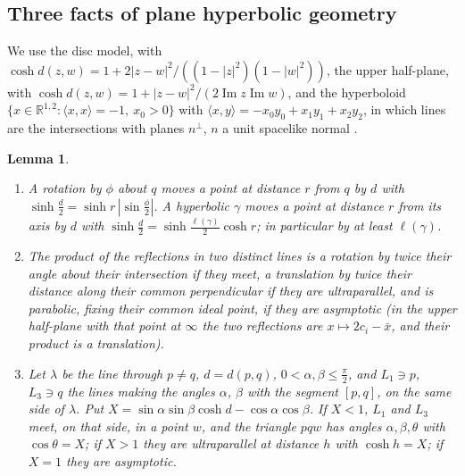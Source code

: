 \documentclass[pdflatex,sn-mathphys-num]{sn-jnl}
\theoremstyle{thmstyleone}%
\newtheorem{lemma}[theorem]{Lemma}%
\theoremstyle{thmstylethree}%
\newcommand{\R}{\mathbb{R}}
\begin{document}
\subsection{Three facts of plane hyperbolic geometry}

We use the disc model, with $\cosh d(z,w)=1+2|z-w|^2/((1-|z|^2)(1-|w|^2))$, the upper half-plane, with $\cosh d(z,w)=1+|z-w|^2/(2\operatorname{Im}z\operatorname{Im}w)$, and the hyperboloid $\{x\in\R^{1,2}:\langle x,x\rangle=-1,\ x_0>0\}$ with $\langle x,y\rangle=-x_0y_0+x_1y_1+x_2y_2$, in which lines are the intersections with planes $n^\perp$, $n$ a unit spacelike normal \cite{beardon1983}.

\begin{lemma}\label{lem:H}
\leavevmode
\begin{enumerate}[label=(H\arabic*)]
\item A rotation by $\phi$ about $q$ moves a point at distance $r$ from $q$ by $d$ with $\sinh\frac d2=\sinh r\,|\sin\frac\phi2|$. A hyperbolic $\gamma$ moves a point at distance $r$ from its axis by $d$ with $\sinh\frac d2=\sinh\frac{\ell(\gamma)}2\cosh r$; in particular by at least $\ell(\gamma)$.
\item The product of the reflections in two distinct lines is a rotation by twice their angle about their intersection if they meet, a translation by twice their distance along their common perpendicular if they are ultraparallel, and is parabolic, fixing their common ideal point, if they are asymptotic (in the upper half-plane with that point at $\infty$ the two reflections are $x\mapsto2c_i-\bar x$, and their product is a translation).
\item Let $\lambda$ be the line through $p\ne q$, $d=d(p,q)$, $0<\alpha,\beta\le\frac\pi2$, and $L_1\ni p$, $L_3\ni q$ the lines making the angles $\alpha$, $\beta$ with the segment $[p,q]$, on the same side of $\lambda$. Put $X=\sin\alpha\sin\beta\cosh d-\cos\alpha\cos\beta$. If $X<1$, $L_1$ and $L_3$ meet, on that side, in a point $w$, and the triangle $pqw$ has angles $\alpha,\beta,\theta$ with $\cos\theta=X$; if $X>1$ they are ultraparallel at distance $h$ with $\cosh h=X$; if $X=1$ they are asymptotic.
\end{enumerate}
\end{lemma}
\end{document}
